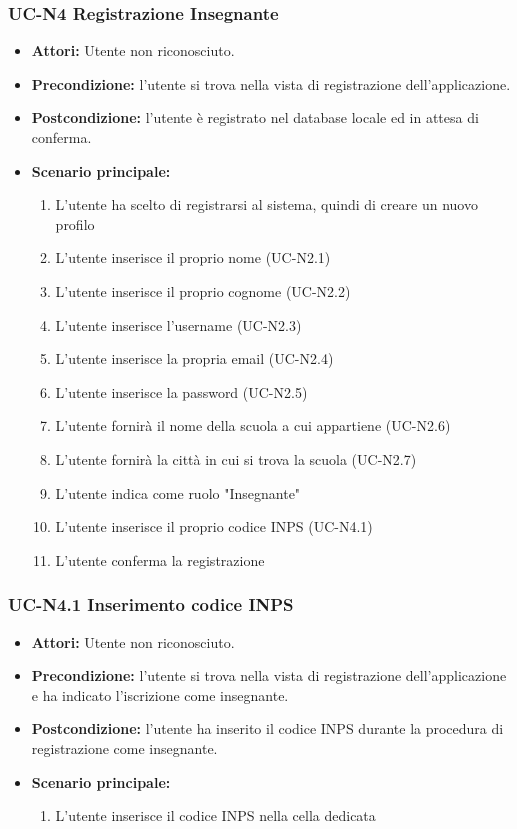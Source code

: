\subsubsection{UC-N4 Registrazione Insegnante}
\begin{itemize}
	\item \textbf{Attori: }Utente non riconosciuto.
	\item \textbf{Precondizione: }l'utente si trova nella vista di registrazione dell'applicazione.
	\item \textbf{Postcondizione: }l'utente è registrato nel database locale ed in attesa di conferma.
	\item \textbf{Scenario principale: }
		\begin{enumerate}
		\item L'utente ha scelto di registrarsi al sistema, quindi di creare un nuovo profilo
		\item L'utente inserisce il proprio nome (UC-N2.1)
		\item L'utente inserisce il proprio cognome (UC-N2.2)
		\item L'utente inserisce l'username (UC-N2.3)
		\item L'utente inserisce la propria email (UC-N2.4)
		\item L'utente inserisce la password (UC-N2.5)
		\item L'utente fornirà il nome della scuola a cui appartiene (UC-N2.6)
		\item L'utente fornirà la città in cui si trova la scuola (UC-N2.7)
		\item L'utente indica come ruolo "Insegnante"
		\item L'utente inserisce il proprio codice INPS (UC-N4.1)
		\item L'utente conferma la registrazione
		\end{enumerate}
\end{itemize}

\subsubsection{UC-N4.1 Inserimento codice INPS}
\begin{itemize}
	\item \textbf{Attori: }Utente non riconosciuto.
	\item \textbf{Precondizione: }l'utente si trova nella vista di registrazione dell'applicazione e ha indicato l'iscrizione come insegnante.
	\item \textbf{Postcondizione: }
	l'utente ha inserito il codice INPS durante la procedura di registrazione come insegnante.
		\item \textbf{Scenario principale:}
		\begin{enumerate}
			\item L'utente inserisce il codice INPS nella cella dedicata
		\end{enumerate}
\end{itemize}

